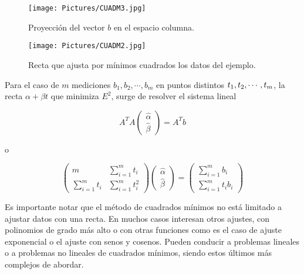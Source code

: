 {\begin{figure}
    \centering
    \texttt{[image: Pictures/CUADM3.jpg]}
    \caption{Proyección del vector $b$ en el espacio columna.}
    \label{MINCUAD_3}
\end{figure} 


\begin{figure}
    \centering
    \texttt{[image: Pictures/CUADM2.jpg]}
    \caption{Recta que ajusta  por mínimos cuadrados los datos del ejemplo.}
    \label{MINCUAD_2}
\end{figure}

Para el caso  de $m$ mediciones  $b_1, b_2,   \cdots, b_m$   en puntos  distintos $t_1, t_2,   \cdots, \\ t_m$, la recta  
$\alpha + \beta t$ que minimiza  $E^2$, surge de resolver el sistema lineal 

 \begin{equation}
A^TA\left(\begin{array}{c} \hat \alpha \\  \hat \beta 
\end{array}
 \right)= A^T b
 \label{210}
\end{equation}

o 

 \begin{equation}
\left(\begin{array}{cc} m & \sum_{i=1}^m t_i  \\  \sum_{i=1}^m t_i &  \sum_{i=1}^m t_i^2 
\end{array}
 \right) \left(\begin{array}{c} \hat \alpha \\  \hat \beta 
\end{array}
 \right)=  \left(\begin{array}{c} \sum_{i=1}^m b_i    \\ \sum_{i=1}^m t_i b_i
\end{array}
 \right)
 \label{220}
\end{equation}


 
  \bigskip
\begin{remark}  
Es importante notar que el método de cuadrados mínimos no está limitado a ajustar datos con una recta. En muchos casos interesan otros ajustes, con polinomios de grado más alto o con otras funciones como es el caso de ajuste  exponencial o el ajuste con senos y cosenos. Pueden conducir a problemas lineales o a problemas no lineales de cuadrados mínimos, siendo estos últimos  más complejos de abordar. 
\end{remark}


}
